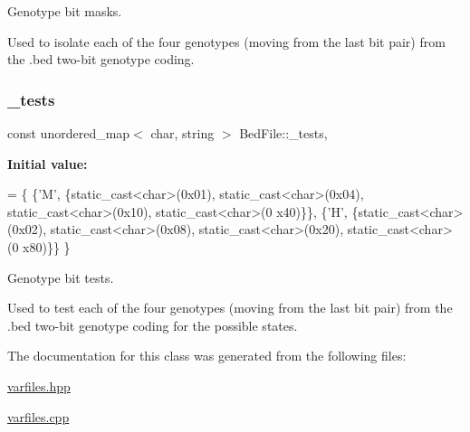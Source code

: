 Genotype bit masks. 

Used to isolate each of the four genotypes (moving from the last bit pair) from the .bed two-\/bit genotype coding. \mbox{\label{classsamp_files_1_1_bed_file_a153af12f613ef8cdea6297e124b92de7}} 
\subsubsection{\texorpdfstring{\+\_\+tests}{\_tests}}
{\footnotesize\ttfamily const unordered\+\_\+map$<$ char, string $>$ Bed\+File\+::\+\_\+tests\hspace{0.3cm}{\ttfamily [static]}, {\ttfamily [protected]}}

{\bfseries Initial value\+:}
\begin{DoxyCode}
= \{
    \{\textcolor{charliteral}{'M'}, \{\textcolor{keyword}{static\_cast<}\textcolor{keywordtype}{char}\textcolor{keyword}{>}(0x01), static\_cast<char>(0x04), \textcolor{keyword}{static\_cast<}\textcolor{keywordtype}{char}\textcolor{keyword}{>}(0x10), static\_cast<char>(0
      x40)\}\},
    \{\textcolor{charliteral}{'H'}, \{\textcolor{keyword}{static\_cast<}\textcolor{keywordtype}{char}\textcolor{keyword}{>}(0x02), static\_cast<char>(0x08), \textcolor{keyword}{static\_cast<}\textcolor{keywordtype}{char}\textcolor{keyword}{>}(0x20), static\_cast<char>(0
      x80)\}\}
\}
\end{DoxyCode}


Genotype bit tests. 

Used to test each of the four genotypes (moving from the last bit pair) from the .bed two-\/bit genotype coding for the possible states. 

The documentation for this class was generated from the following files\+:\begin{DoxyCompactItemize}
\item 
\hyperlink{varfiles_8hpp}{varfiles.\+hpp}\item 
\hyperlink{varfiles_8cpp}{varfiles.\+cpp}\end{DoxyCompactItemize}
